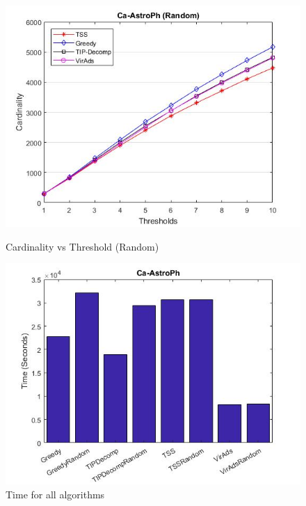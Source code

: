\begin{figure}[h!]
\begin{minipage}[t]{0.50\textwidth}
\includegraphics[width=\linewidth,keepaspectratio=true]{images/ca-astrophresultrandom.jpg}
\caption{Cardinality vs Threshold (Random)}

\end{minipage}
\begin{minipage}[t]{0.50\textwidth}
\includegraphics[width=\linewidth,keepaspectratio=true]{images/astrophtime.jpg}
\caption{Time for all algorithms}
\end{minipage}
\end{figure}

